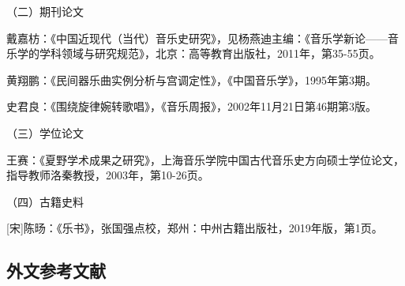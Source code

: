 \noindent （二）期刊论文

\begin{achievements}
\item 戴嘉枋：《中国近现代（当代）音乐史研究》，见杨燕迪主编：《音乐学新论——音乐学的学科领域与研究规范》，北京：高等教育出版社，2011年，第35-55页。
\item 黄翔鹏：《民间器乐曲实例分析与宫调定性》，《中国音乐学》，1995年第3期。
\item 史君良：《围绕旋律婉转歌唱》，《音乐周报》，2002年11月21日第46期第3版。
\end{achievements}

\noindent （三）学位论文

\begin{achievements}
\item 王赛：《夏野学术成果之研究》，上海音乐学院中国古代音乐史方向硕士学位论文，指导教师洛秦教授，2003年，第10-26页。
\end{achievements}

\noindent （四）古籍史料

\begin{achievements}
\item {[宋]}陈旸：《乐书》，张国强点校，郑州：中州古籍出版社，2019年版，第1页。
\end{achievements}



\subsection*{外文参考文献}

